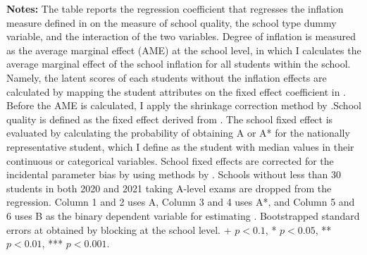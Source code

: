 \begin{table}[htbp]
\begin{threeparttable}
\begin{tabular}{lcccccc}
\bottomrule
\end{tabular}
\noindent\begin{minipage}{\textwidth}
\footnotesize
\textbf{Notes:} The table reports the regression coefficient that regresses the inflation measure defined in  on the measure of school quality, the school type dummy variable, and the interaction of the two variables. Degree of inflation is measured as the average marginal effect (AME) at the school level, in which I calculates the average marginal effect of the school inflation for all students within the school. Namely, the latent scores of each students without the inflation effects are calculated by mapping the student attributes on the fixed effect coefficient in . Before the AME is calculated, I apply the shrinkage correction method by \cite{b933f52e-83fe-34bb-bf19-f7f3e5459001}.School quality is defined as the fixed effect derived from . The school fixed effect is evaluated by calculating the probability of obtaining A or A* for the nationally representative student, which I define as the student with median values in their continuous or categorical variables. School fixed effects are corrected for the incidental parameter bias by using methods by \cite{FERNANDEZVAL2016291}
. Schools without less than 30 students in both 2020 and 2021 taking A-level exams are dropped from the regression. Column 1 and 2 uses A, Column 3 and 4 uses A*, and Column 5 and 6 uses B as the binary dependent variable for estimating .  Bootstrapped standard errors at obtained by blocking at the school level. + $p<0.1$, * $p<0.05$, ** $p<0.01$, *** $p<0.001$.
\end{minipage}
\end{threeparttable}
\end{table}
